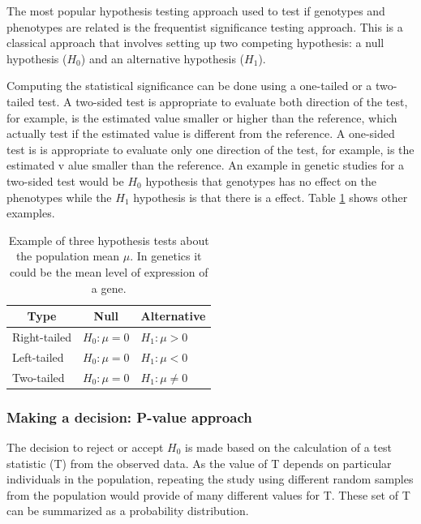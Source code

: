 The most popular hypothesis testing approach used to test if
genotypes and phenotypes are related  is the frequentist significance testing approach.
This is a classical approach that involves setting up two competing hypothesis: a
null hypothesis ($H_0$) and an alternative hypothesis ($H_1$).

Computing the statistical significance can be done using a one-tailed or a two-tailed test.
A two-sided test is appropriate to evaluate both direction of the test, for example,
is the estimated value smaller or higher than the reference, which actually test if the
 estimated value is different from the reference.
A one-sided test is  is appropriate to evaluate only one direction of the test,
for example, is the estimated v alue smaller than the reference.
An example in genetic studies for a two-sided test would be $H_0$
hypothesis that genotypes has no effect on the phenotypes
while the $H_1$ hypothesis is that there is a effect.
Table \ref{hypothesis-tests} shows other examples.

\begin{table}[h!]
\centering
\caption[Hypothesis tests]{Example of three hypothesis tests about the population mean $\mu$. In genetics it could be the mean level of expression of a gene.}
\label{hypothesis-tests}
\begin{tabular}{@{}lll@{}}
\toprule
\multicolumn{1}{c}{\textbf{Type}} & \multicolumn{1}{c}{\textbf{Null}} & \multicolumn{1}{c}{\textbf{Alternative}} \\ \midrule
Right-tailed & $H_{0}:\mu = 0$ & $H_{1}: \mu >  0 $  \\
Left-tailed & $H_{0}:\mu = 0$ & $H_{1}: \mu <  0 $  \\
Two-tailed & $H_{0}:\mu = 0$ & $H_{1}: \mu \neq 0 $ \\ \bottomrule
\end{tabular}
\end{table}

\subsubsection{Making a decision: P-value approach}

The decision to reject or accept $H_0$ is made based on the calculation of a test statistic (T) from the observed data.
As the value of T depends on particular individuals in the population, repeating the study
using  different random samples from the population would provide of many different values for T.
These set of T can be summarized as a probability distribution.

